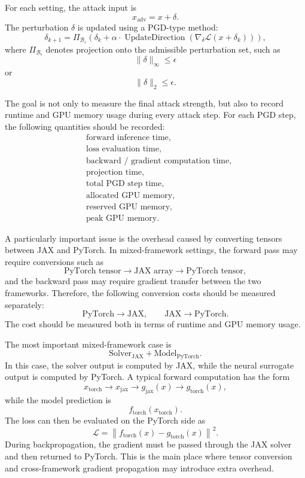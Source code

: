 \documentclass{article}
\begin{document}
For each setting, the attack input is
\[
x_{\mathrm{adv}} = x + \delta.
\]
The perturbation \(\delta\) is updated using a PGD-type method:
\[
\delta_{k+1}
=
\Pi_{\mathcal{B}_{\epsilon}}
\left(
\delta_k
+
\alpha \cdot \operatorname{UpdateDirection}
\left(
\nabla_{\delta}\mathcal{L}(x+\delta_k)
\right)
\right),
\]
where \(\Pi_{\mathcal{B}_{\epsilon}}\) denotes projection onto the admissible perturbation set, such as
\[
\|\delta\|_{\infty} \leq \epsilon
\]
or
\[
\|\delta\|_2 \leq \epsilon.
\]

The goal is not only to measure the final attack strength, but also to record runtime and GPU memory usage during every attack step. For each PGD step, the following quantities should be recorded:
\[
\begin{aligned}
&\text{forward inference time}, \\
&\text{loss evaluation time}, \\
&\text{backward / gradient computation time}, \\
&\text{projection time}, \\
&\text{total PGD step time}, \\
&\text{allocated GPU memory}, \\
&\text{reserved GPU memory}, \\
&\text{peak GPU memory}.
\end{aligned}
\]

A particularly important issue is the overhead caused by converting tensors between JAX and PyTorch. In mixed-framework settings, the forward pass may require conversions such as
\[
\text{PyTorch tensor}
\rightarrow
\text{JAX array}
\rightarrow
\text{PyTorch tensor},
\]
and the backward pass may require gradient transfer between the two frameworks. Therefore, the following conversion costs should be measured separately:
\[
\text{PyTorch} \rightarrow \text{JAX},
\qquad
\text{JAX} \rightarrow \text{PyTorch}.
\]
The cost should be measured both in terms of runtime and GPU memory usage.

The most important mixed-framework case is
\[
\text{Solver}_{\mathrm{JAX}} + \text{Model}_{\mathrm{PyTorch}}.
\]
In this case, the solver output is computed by JAX, while the neural surrogate output is computed by PyTorch. A typical forward computation has the form
\[
x_{\mathrm{torch}}
\rightarrow
x_{\mathrm{jax}}
\rightarrow
g_{\mathrm{jax}}(x)
\rightarrow
g_{\mathrm{torch}}(x),
\]
while the model prediction is
\[
f_{\mathrm{torch}}(x_{\mathrm{torch}}).
\]
The loss can then be evaluated on the PyTorch side as
\[
\mathcal{L}
=
\left\|
f_{\mathrm{torch}}(x)
-
g_{\mathrm{torch}}(x)
\right\|^2.
\]
During backpropagation, the gradient must be passed through the JAX solver and then returned to PyTorch. This is the main place where tensor conversion and cross-framework gradient propagation may introduce extra overhead.
\end{document}
